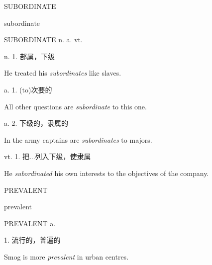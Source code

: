 \begin{flashcard}{
SUBORDINATE

subordinate
}
\begin{center}
SUBORDINATE n. a.  vt. 
\end{center}
n. 1. 部属，下级

He treated his \textit{subordinates} like slaves.

a. 1. (to)次要的

All other questions are \textit{subordinate} to this one.

a. 2. 下级的，隶属的

In the army captains are \textit{subordinates} to majors.

vt. 1. 把...列入下级，使隶属

He \textit{subordinated} his own interests to the objectives of the company.

\end{flashcard}
\begin{flashcard}{
PREVALENT

prevalent
}
\begin{center}
PREVALENT a. 
\end{center}
1. 流行的，普遍的

Smog is more \textit{prevalent} in urban centres.

\end{flashcard}
